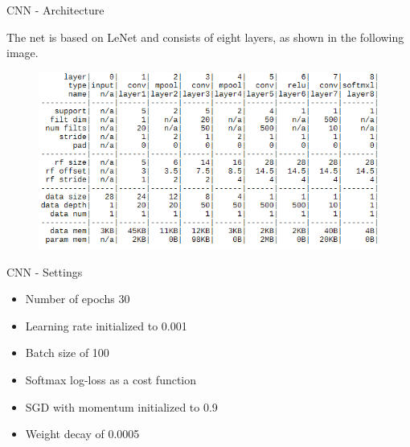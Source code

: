 \begin{tframe}{CNN - Architecture}

The net is based on LeNet and consists of eight layers, as shown in the following image.

\begin{figure}[h]
	\begin{center}
		\includegraphics[width=1\textwidth]{img/cnn.png}
	\end{center}
	\label{fig:cnn}
\end{figure}

\end{tframe}

\begin{tframe}{CNN - Settings}

\vspace{0.1in}
\vspace{0.1in}
\vspace{0.1in}

\begin{itemize}
\item Number of epochs 30
\item Learning rate initialized to 0.001
\item Batch size of 100
\item Softmax log-loss as a cost function
\item SGD with momentum initialized to 0.9
\item Weight decay of 0.0005
\end{itemize}


\end{tframe}